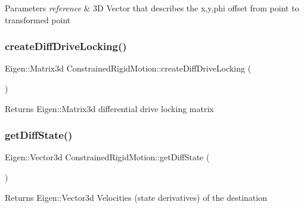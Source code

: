 \begin{DoxyParams}{Parameters}
{\em reference} & 3D Vector that describes the x,y,phi offset from point to transformed point \\
\hline
\end{DoxyParams}
\mbox{\label{group__RigidMotion_gad4fb6e13815454559ec7e52b291489af}} 
\subsubsection{\texorpdfstring{create\+Diff\+Drive\+Locking()}{createDiffDriveLocking()}}
{\footnotesize\ttfamily Eigen\+::\+Matrix3d Constrained\+Rigid\+Motion\+::create\+Diff\+Drive\+Locking (\begin{DoxyParamCaption}{ }\end{DoxyParamCaption})\hspace{0.3cm}{\ttfamily [static]}}

\begin{DoxyReturn}{Returns}
Eigen\+::\+Matrix3d differential drive locking matrix 
\end{DoxyReturn}
\mbox{\label{group__RigidMotion_ga59bdced4bb2e565bc39312e5328507ef}} 
\subsubsection{\texorpdfstring{get\+Diff\+State()}{getDiffState()}}
{\footnotesize\ttfamily Eigen\+::\+Vector3d Constrained\+Rigid\+Motion\+::get\+Diff\+State (\begin{DoxyParamCaption}{ }\end{DoxyParamCaption})}

\begin{DoxyReturn}{Returns}
Eigen\+::\+Vector3d Velocities (state derivatives) of the destination 
\end{DoxyReturn}
\mbox{\label{group__RigidMotion_gabde902d2f91035cd5054a33dab4acc48}} 
